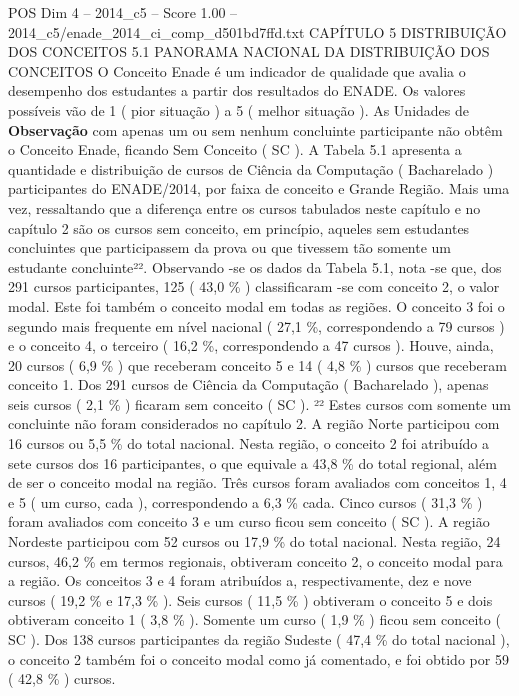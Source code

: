 \begin{textsample}{POS Dim 4 – 2014\_c5 – Score 1.00 – 2014\_c5/enade\_2014\_ci\_comp\_d501bd7ffd.txt}  \label{ex:f4_pos_155}
CAPÍTULO 5 DISTRIBUIÇÃO DOS CONCEITOS 5.1 PANORAMA NACIONAL DA DISTRIBUIÇÃO DOS CONCEITOS O Conceito Enade é um indicador de qualidade que avalia o desempenho dos estudantes a partir dos resultados do ENADE.
Os valores possíveis vão de 1 ( pior situação ) a 5 ( melhor situação ).
As Unidades de \textbf{Observação} com apenas um ou sem nenhum concluinte participante não obtêm o Conceito Enade, ficando Sem Conceito ( SC ).
A Tabela 5.1 apresenta a quantidade e distribuição de cursos de Ciência da Computação ( Bacharelado ) participantes do ENADE/2014, por faixa de conceito e Grande Região.
Mais uma vez, ressaltando que a diferença entre os cursos tabulados neste capítulo e no capítulo 2 são os cursos sem conceito, em princípio, aqueles sem estudantes concluintes que participassem da prova ou que tivessem tão somente um estudante concluinte²².
Observando -se os dados da Tabela 5.1, nota -se que, dos 291 cursos participantes, 125 ( 43,0 \% ) classificaram -se com conceito 2, o valor modal.
Este foi também o conceito modal em todas as regiões.
O conceito 3 foi o segundo mais frequente em nível nacional ( 27,1 \%, correspondendo a 79 cursos ) e o conceito 4, o terceiro ( 16,2 \%, correspondendo a 47 cursos ).
Houve, ainda, 20 cursos ( 6,9 \% ) que receberam conceito 5 e 14 ( 4,8 \% ) cursos que receberam conceito 1.
Dos 291 cursos de Ciência da Computação ( Bacharelado ), apenas seis cursos ( 2,1 \% ) ficaram sem conceito ( SC ). ²² Estes cursos com somente um concluinte não foram considerados no capítulo 2.
A região Norte participou com 16 cursos ou 5,5 \% do total nacional.
Nesta região, o conceito 2 foi atribuído a sete cursos dos 16 participantes, o que equivale a 43,8 \% do total regional, além de ser o conceito modal na região.
Três cursos foram avaliados com conceitos 1, 4 e 5 ( um curso, cada ), correspondendo a 6,3 \% cada.
Cinco cursos ( 31,3 \% ) foram avaliados com conceito 3 e um curso ficou sem conceito ( SC ).
A região Nordeste participou com 52 cursos ou 17,9 \% do total nacional.
Nesta região, 24 cursos, 46,2 \% em termos regionais, obtiveram conceito 2, o conceito modal para a região.
Os conceitos 3 e 4 foram atribuídos a, respectivamente, dez e nove cursos ( 19,2 \% e 17,3 \% ).
Seis cursos ( 11,5 \% ) obtiveram o conceito 5 e dois obtiveram conceito 1 ( 3,8 \% ).
Somente um curso ( 1,9 \% ) ficou sem conceito ( SC ).
Dos 138 cursos participantes da região Sudeste ( 47,4 \% do total nacional ), o conceito 2 também foi o conceito modal como já comentado, e foi obtido por 59 ( 42,8 \% ) cursos.

\end{textsample}
